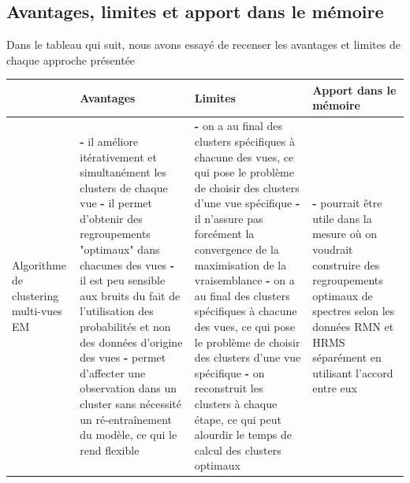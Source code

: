 \documentclass[12pt, french, latin.medieval, a4paper]{report}
\begin{document}
    	\subsection{Avantages, limites et apport dans le mémoire}
        	Dans le tableau qui suit, nous avons essayé de recenser les avantages et limites de chaque approche présentée
        	\begin{center}
            	\begin{longtable}{|p{2.5cm}|p{4.5cm}|p{4.5cm}|p{3cm}|} \hline
                	~ & {Avantages} & {Limites} & {Apport dans le mémoire} \\
                    	\hline
                    	Algorithme de clustering multi-vues EM
                    	&
                    	{\textbf{-} il améliore itérativement et simultanément les clusters de chaque vue} \newline\newline
                    	{\textbf{-} il permet d'obtenir des regroupements "optimaux" dans chacunes des vues} \newline\newline
                    	{\textbf{-} il est peu sensible aux bruits du fait de l'utilisation des probabilités et non des données d'origine des vues} \newline\newline
                    	{\textbf{-} permet d'affecter une observation dans un cluster sans nécessité un ré-entraînement du modèle, ce qui le rend flexible}
                    	&
                    	{\textbf{-} on a au final des clusters spécifiques à chacune des vues, ce qui pose le problème de choisir des clusters d'une vue spécifique} \newline\newline
                    	{\textbf{-} il n'assure pas forcément la convergence de la maximisation de la vraisemblance} \newline\newline
                    	{\textbf{-} on a au final des clusters spécifiques à chacune des vues, ce qui pose le problème de choisir des clusters d'une vue spécifique} \newline\newline
                    	{\textbf{-} on reconstruit les clusters à chaque étape, ce qui peut alourdir le temps de calcul des clusters optimaux}
                    	&
                    	{\textbf{-} pourrait être utile dans la mesure où on voudrait construire des regroupements optimaux de spectres selon les données RMN et HRMS séparément en utilisant l'accord entre eux} \newline\newline

\end{longtable}
\end{center}
\end{document}
